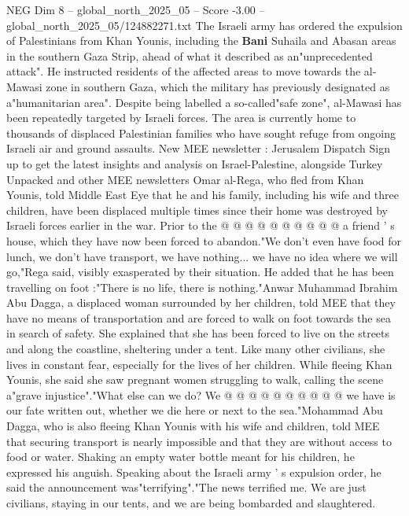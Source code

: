 \begin{textsample}{NEG Dim 8 – global\_north\_2025\_05 – Score -3.00 – global\_north\_2025\_05/124882271.txt}  \label{ex:f8_neg_053}
The Israeli army has ordered the expulsion of Palestinians from Khan Younis, including the \textbf{Bani} Suhaila and Abasan areas in the southern Gaza Strip, ahead of what it described as an"unprecedented attack".
He instructed residents of the affected areas to move towards the al-Mawasi zone in southern Gaza, which the military has previously designated as a"humanitarian area".
Despite being labelled a so-called"safe zone", al-Mawasi has been repeatedly targeted by Israeli forces.
The area is currently home to thousands of displaced Palestinian families who have sought refuge from ongoing Israeli air and ground assaults.
New MEE newsletter : Jerusalem Dispatch Sign up to get the latest insights and analysis on Israel-Palestine, alongside Turkey Unpacked and other MEE newsletters Omar al-Rega, who fled from Khan Younis, told Middle East Eye that he and his family, including his wife and three children, have been displaced multiple times since their home was destroyed by Israeli forces earlier in the war.
Prior to the @ @ @ @ @ @ @ @ @ @ a friend ' s house, which they have now been forced to abandon."We don't even have food for lunch, we don't have transport, we have nothing... we have no idea where we will go,"Rega said, visibly exasperated by their situation.
He added that he has been travelling on foot :"There is no life, there is nothing."Anwar Muhammad Ibrahim Abu Dagga, a displaced woman surrounded by her children, told MEE that they have no means of transportation and are forced to walk on foot towards the sea in search of safety.
She explained that she has been forced to live on the streets and along the coastline, sheltering under a tent.
Like many other civilians, she lives in constant fear, especially for the lives of her children.
While fleeing Khan Younis, she said she saw pregnant women struggling to walk, calling the scene a"grave injustice"."What else can we do?
We @ @ @ @ @ @ @ @ @ @ we have is our fate written out, whether we die here or next to the sea."Mohammad Abu Dagga, who is also fleeing Khan Younis with his wife and children, told MEE that securing transport is nearly impossible and that they are without access to food or water.
Shaking an empty water bottle meant for his children, he expressed his anguish.
Speaking about the Israeli army ' s expulsion order, he said the announcement was"terrifying"."The news terrified me.
We are just civilians, staying in our tents, and we are being bombarded and slaughtered.

\end{textsample}
